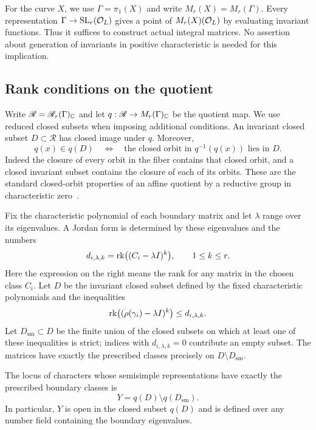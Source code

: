 For the curve $X$, we use $\Gamma=\pi_1(X)$ and write $M_r(X)=M_r(\Gamma)$.
Every representation $\Gamma\to\operatorname{SL}_r(\mathcal O_L)$ gives a point of
$M_r(X)(\mathcal O_L)$ by evaluating invariant functions. Thus it suffices to
construct actual integral matrices. No assertion about generation of
invariants in positive characteristic is needed for this implication.

\subsection{Rank conditions on the quotient}

Write $\mathscr R=\mathscr R_r(\Gamma)_\mathbb C$ and let
$q:\mathscr R\to M_r(\Gamma)_\mathbb C$ be the quotient map. We use reduced
closed subsets when imposing additional conditions. An invariant closed
subset $D\subset\mathscr R$ has closed image under $q$. Moreover,
\begin{equation}\label{eq:closed-orbit-test}
 q(x)\in q(D)
 \quad\Longleftrightarrow\quad
 \text{the closed orbit in }q^{-1}(q(x))\text{ lies in }D.
\end{equation}
Indeed the closure of every orbit in the fiber contains that closed
orbit, and a closed invariant subset contains the closure of each of
its orbits. These are the standard closed-orbit properties of an affine
quotient by a reductive group in characteristic zero~\cite[pp.~184--185]{MumfordSuominen}.

Fix the characteristic polynomial of each boundary matrix and let
$\lambda$ range over its eigenvalues. A Jordan form is determined by
these eigenvalues and the numbers
\[
 d_{i,\lambda,k}=\operatorname{rk}\bigl((C_i-\lambda I)^k\bigr),
 \qquad 1\leq k\leq r.
\]
Here the expression on the right means the rank for any matrix in
the chosen class $C_i$. Let $D$ be the invariant closed subset defined
by the fixed characteristic polynomials and the inequalities
\[
 \operatorname{rk}\bigl((\rho(\gamma_i)-\lambda I)^k\bigr)
 \leq d_{i,\lambda,k}.
\]
Let $D_{\mathrm{sm}}\subset D$ be the finite union of the closed subsets
on which at least one of these inequalities is strict; indices with
$d_{i,\lambda,k}=0$ contribute an empty subset. The matrices have exactly
the prescribed classes precisely on $D\setminus D_{\mathrm{sm}}$.

\begin{lemma}\label{lem:exact-stratum}
The locus of characters whose semisimple representations have exactly
the prescribed boundary classes is
\[
 Y=q(D)\setminus q(D_{\mathrm{sm}}).
\]
In particular, $Y$ is open in the closed subset $q(D)$ and is defined
over any number field containing the boundary eigenvalues.
\end{lemma}

